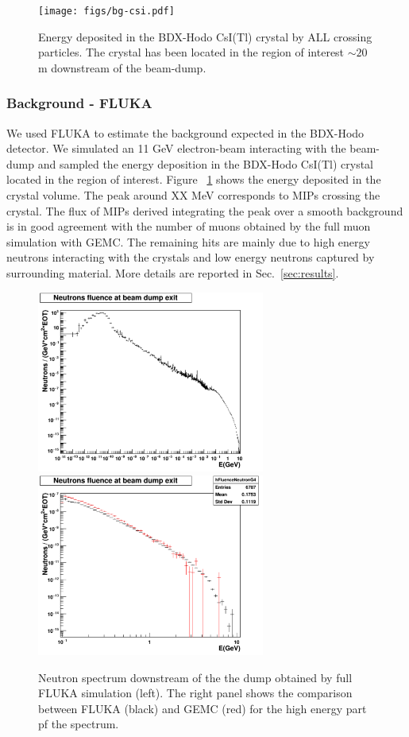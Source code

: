 \begin{figure}[h!] 
\center
\texttt{[image: figs/bg-csi.pdf]}   
\caption{Energy deposited in the BDX-Hodo CsI(Tl) crystal by ALL crossing particles. The crystal has been located in the region of interest $\sim 20$ m downstream of the beam-dump. }
\label{fig:bg-csi}
\end{figure}

\subsubsection{Background - FLUKA}
We used FLUKA to estimate the background expected in the BDX-Hodo detector.
We simulated an 11 GeV electron-beam interacting with the beam-dump   and sampled the energy deposition in the BDX-Hodo CsI(Tl) crystal  located in the region of interest. 
Figure ~\ref{fig:bg-csi} shows the energy deposited in the crystal volume. The peak around XX MeV corresponds to MIPs crossing the crystal. The flux of MIPs derived  integrating the peak over a smooth background is in good agreement with the number of muons obtained by the full muon simulation with  GEMC. The remaining hits are mainly due to high energy neutrons interacting with the crystals and low energy neutrons captured by surrounding material. More details are reported in Sec.~\ref{sec:results}.
\begin{figure}[h!] 
\center
\includegraphics[width=7.5cm]{figs/NeutronsDump_1D.pdf}    
\includegraphics[width=7.5cm]{figs/NeutronsDumpComparison_1D.pdf}   
\caption{Neutron spectrum downstream of the the dump obtained by full FLUKA simulation (left). The right panel shows  the comparison between FLUKA (black) and GEMC (red) for the high energy part pf the spectrum.}
\label{fig:n-comp}
\end{figure}
